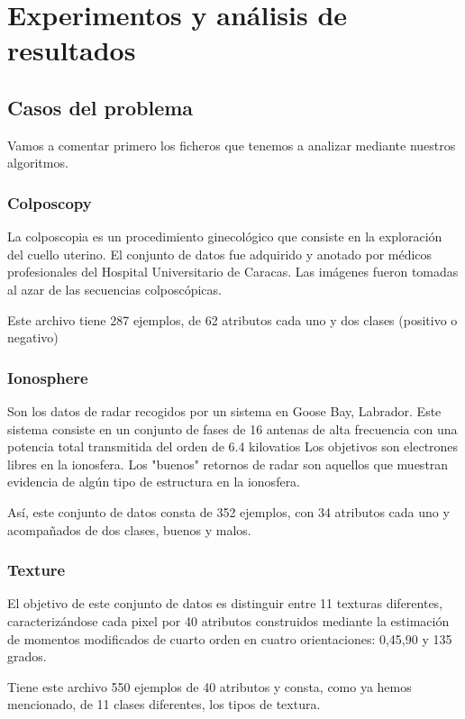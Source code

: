 \documentclass[11pt]{article}
\begin{document}
\section{Experimentos y análisis de resultados}

\subsection{Casos del problema}
Vamos a comentar primero los ficheros que tenemos a analizar mediante nuestros algoritmos.

\subsubsection{Colposcopy}
La colposcopia es un procedimiento ginecológico que consiste en la exploración del cuello uterino. El conjunto de datos fue adquirido y anotado por médicos profesionales del Hospital Universitario de Caracas. Las imágenes fueron tomadas al azar de las secuencias colposcópicas.

Este archivo tiene 287 ejemplos, de 62 atributos cada uno y dos clases (positivo o negativo)

\subsubsection{Ionosphere}
Son los datos de radar recogidos  por un sistema  en Goose Bay, Labrador. Este sistema consiste en un conjunto de fases de 16 antenas de alta frecuencia  con una potencia total transmitida  del orden de 6.4 kilovatios Los objetivos son electrones libres en la ionosfera. Los "buenos" retornos de radar son aquellos que muestran evidencia de algún tipo de estructura en la ionosfera. 

Así, este conjunto de datos consta de 352 ejemplos, con 34 atributos cada uno y acompañados de dos clases, buenos y malos.

\subsubsection{Texture}
El objetivo de este conjunto de datos es distinguir entre 11 texturas diferentes, caracterizándose cada pixel por 40 atributos construidos mediante la estimación de momentos modificados de cuarto orden en cuatro orientaciones: 0,45,90 y 135 grados.

Tiene este archivo 550 ejemplos de 40 atributos y consta, como ya hemos mencionado, de 11 clases diferentes, los tipos de textura.
\end{document}

